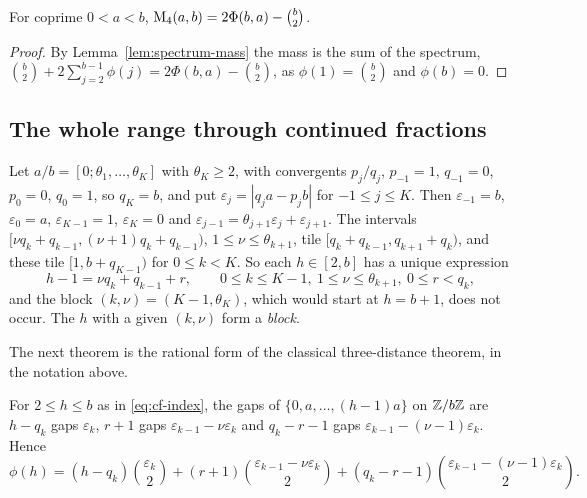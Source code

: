 \begin{corollary}\label{cor:family-mass}
For coprime $0<a<b$, $\operatorname{M}_4(a,b)=2\Phi(b,a)-\binom b2$.
\end{corollary}

\begin{proof}
By Lemma~\ref{lem:spectrum-mass} the mass is the sum of the spectrum, $\binom b2+2\sum_{j=2}^{b-1}\phi(j)=2\Phi(b,a)-\binom b2$, as $\phi(1)=\binom b2$ and $\phi(b)=0$.
\end{proof}

\subsection{The whole range through continued fractions}\label{subsec:family-cf}

Let $a/b=[0;\theta_1,\dots,\theta_K]$ with $\theta_K\ge2$, with convergents $p_j/q_j$, $p_{-1}=1$, $q_{-1}=0$, $p_0=0$, $q_0=1$, so $q_K=b$, and put $\varepsilon_j=|q_ja-p_jb|$ for $-1\le j\le K$. Then $\varepsilon_{-1}=b$, $\varepsilon_0=a$, $\varepsilon_{K-1}=1$, $\varepsilon_K=0$ and $\varepsilon_{j-1}=\theta_{j+1}\varepsilon_j+\varepsilon_{j+1}$. The intervals $[\nu q_k+q_{k-1},(\nu +1)q_k+q_{k-1})$, $1\le \nu \le \theta_{k+1}$, tile $[q_k+q_{k-1},q_{k+1}+q_k)$, and these tile $[1,b+q_{K-1})$ for $0\le k<K$. So each $h\in[2,b]$ has a unique expression
\begin{equation}\label{eq:cf-index}
h-1=\nu q_k+q_{k-1}+r,\qquad 0\le k\le K-1,\ 1\le \nu \le \theta_{k+1},\ 0\le r<q_k ,
\end{equation}
and the block $(k,\nu )=(K-1,\theta_K)$, which would start at $h=b+1$, does not occur. The $h$ with a given $(k,\nu )$ form a \emph{block}.

The next theorem is the rational form of the classical three-distance theorem, in the notation above.

\begin{theorem}\label{thm:three-distance}
For $2\le h\le b$ as in \eqref{eq:cf-index}, the gaps of $\{0,a,\dots,(h-1)a\}$ on $\mathbb{Z}/b\mathbb{Z}$ are $h-q_k$ gaps $\varepsilon_k$, $r+1$ gaps $\varepsilon_{k-1}-\nu \varepsilon_k$ and $q_k-r-1$ gaps $\varepsilon_{k-1}-(\nu -1)\varepsilon_k$. Hence
\[
\phi(h)=(h-q_k)\binom{\varepsilon_k}2+(r+1)\binom{\varepsilon_{k-1}-\nu \varepsilon_k}2+(q_k-r-1)\binom{\varepsilon_{k-1}-(\nu -1)\varepsilon_k}2 .
\]
\end{theorem}

